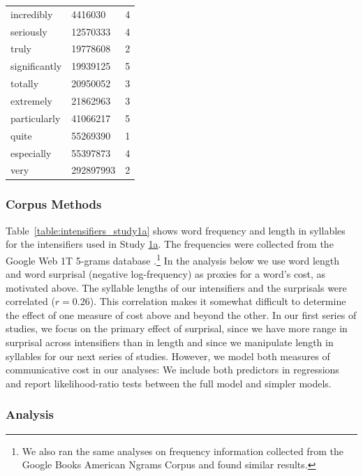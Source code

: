 \documentclass[10pt,letterpaper]{article}
\begin{document}
\begin{table}[ht]
\begin{center}
\begin{tabular}{llc}
    incredibly & 4416030 & 4 \\
    seriously & 12570333 & 4 \\
    truly & 19778608 & 2 \\
    significantly & 19939125 & 5 \\
    totally & 20950052 & 3 \\
    extremely & 21862963 & 3 \\
    particularly & 41066217 & 5 \\
    quite & 55269390 & 1 \\
    especially & 55397873 & 4 \\
    very & 292897993 & 2
  \end{tabular}
 \end{center}
\end{table}

\subsubsection{Corpus Methods}

Table~\ref{table:intensifiers_study1a} shows word frequency and length in syllables for the intensifiers used in Study \hyperref[sec:study1a]{1a}.
The frequencies were collected from the Google Web 1T 5-grams database \cite{brants_web_2006}.\footnote{
  We also ran the same analyses on frequency information collected from the Google Books American Ngrams Corpus \cite{michel_quantitative_2011} and found similar results.
}
In the analysis below we use word length and word surprisal (negative log-frequency) as proxies for a word's cost, as motivated above.
The syllable lengths of our intensifiers and the surprisals were correlated ($r = 0.26$).
This correlation makes it somewhat difficult to determine the effect of one measure of cost above and beyond the other.
In our first series of studies, we focus on the primary effect of surprisal, since we have more range in surprisal across intensifiers than in length and since we manipulate length in syllables for our next series of studies.
However, we model both measures of communicative cost in our analyses: We include both predictors in regressions and report likelihood-ratio tests between the full model and simpler models.

\subsubsection{Analysis}
\end{document}
